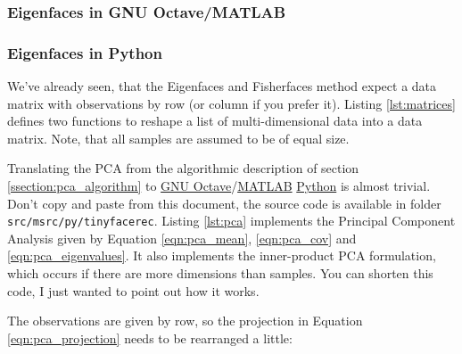 \ifx\python\undefined 
\subsubsection{Eigenfaces in GNU Octave/MATLAB}
\else
\subsubsection{Eigenfaces in Python}
\fi

\ifx\python\undefined
\else
	We've already seen, that the Eigenfaces and Fisherfaces method expect a data matrix with observations by row (or column if you prefer it). Listing \ref{lst:matrices} defines two functions to reshape a list of multi-dimensional data into a data matrix. Note, that all samples are assumed to be of equal size.

	
\fi

Translating the PCA from the algorithmic description of section \ref{ssection:pca_algorithm} to \ifx\python\undefined \href{http://www.gnu.org/software/octave/}{GNU Octave}/\href{http://www.mathworks.com}{MATLAB} \else \href{http://www.python.org}{Python} \fi is almost trivial. Don't copy and paste from this document, the source code is available in folder \ifx\python\undefined \lstinline|src/m|\else \lstinline|src/py/tinyfacerec|\fi. Listing \ref{lst:pca} implements the Principal Component Analysis given by Equation \ref{eqn:pca_mean}, \ref{eqn:pca_cov} and \ref{eqn:pca_eigenvalues}. It also implements the inner-product PCA formulation, which occurs if there are more dimensions than samples. You can shorten this code, I just wanted to point out how it works.

\ifx\python\undefined
	
\else
	
\fi

The observations are given by row, so the projection in Equation \ref{eqn:pca_projection} needs to be rearranged a little:

\ifx\python\undefined
	
\else
	
\fi


